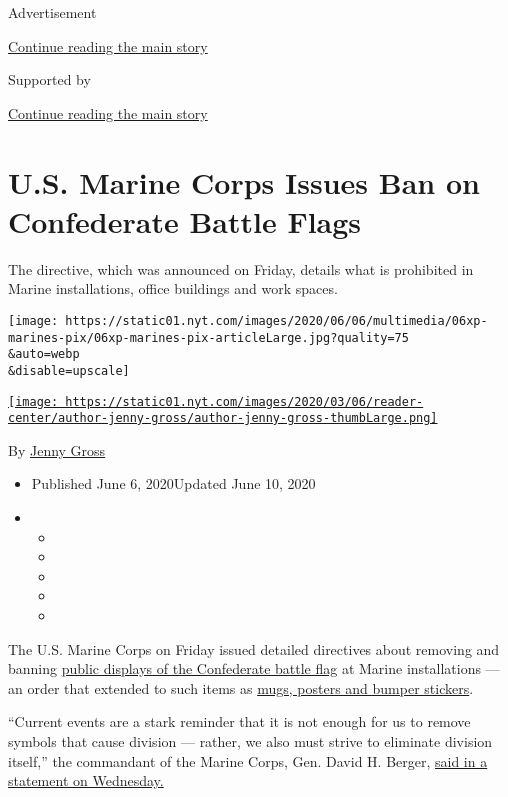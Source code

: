 Advertisement

\protect\hyperlink{after-top}{Continue reading the main story}

Supported by

\protect\hyperlink{after-sponsor}{Continue reading the main story}

\hypertarget{us-marine-corps-issues-ban-on-confederate-battle-flags}{%
\section{U.S. Marine Corps Issues Ban on Confederate Battle
Flags}\label{us-marine-corps-issues-ban-on-confederate-battle-flags}}

The directive, which was announced on Friday, details what is prohibited
in Marine installations, office buildings and work spaces.

\texttt{[image: https://static01.nyt.com/images/2020/06/06/multimedia/06xp-marines-pix/06xp-marines-pix-articleLarge.jpg?quality=75\\\&auto=webp\\\&disable=upscale]}

\href{https://www.nytimes.com/by/jenny-gross}{\texttt{[image: https://static01.nyt.com/images/2020/03/06/reader-center/author-jenny-gross/author-jenny-gross-thumbLarge.png]}}

By \href{https://www.nytimes.com/by/jenny-gross}{Jenny Gross}

\begin{itemize}
\item
  Published June 6, 2020Updated June 10, 2020
\item
  \begin{itemize}
  \item
  \item
  \item
  \item
  \item
  \end{itemize}
\end{itemize}

The U.S. Marine Corps on Friday issued detailed directives about
removing and banning
\href{https://www.nytimes.com/news-event/confederate-flags-monuments-statues}{public
displays of the Confederate battle flag} at Marine installations --- an
order that extended to such items as
\href{https://twitter.com/USMC/status/1269075089078784001?s=20}{mugs,
posters and bumper stickers}.

``Current events are a stark reminder that it is not enough for us to
remove symbols that cause division --- rather, we also must strive to
eliminate division itself,'' the commandant of the Marine Corps, Gen.
David H. Berger,
\href{https://www.marines.mil/News/Press-Releases/Press-Release-Display/Article/2207572/message-from-the-commandant-of-the-marine-corps-and-the-sergeant-major-of-the-m/fbclid/IwAR12-WqkUEslW8WmtMiCk6CwitGjlg6xOg__tU5z7nUZH-2KD19eG4jCvBY/}{said
in a statement on Wednesday.}

